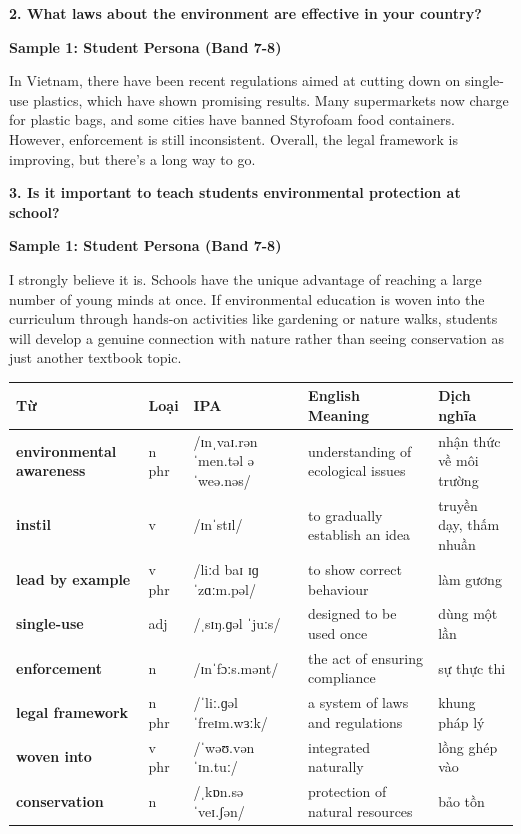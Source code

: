 \separator

\begin{ieltsquestion}
\textbf{2. What laws about the environment are effective in your country?}
\end{ieltsquestion}
\textbf{Sample 1: Student Persona (Band 7-8)}

In Vietnam, there have been recent regulations aimed at cutting down on single-use plastics, which have shown promising results. Many supermarkets now charge for plastic bags, and some cities have banned Styrofoam food containers. However, enforcement is still inconsistent. Overall, the legal framework is improving, but there's a long way to go.

\separator

\begin{ieltsquestion}
\textbf{3. Is it important to teach students environmental protection at school?}
\end{ieltsquestion}
\textbf{Sample 1: Student Persona (Band 7-8)}

I strongly believe it is. Schools have the unique advantage of reaching a large number of young minds at once. If environmental education is woven into the curriculum through hands-on activities like gardening or nature walks, students will develop a genuine connection with nature rather than seeing conservation as just another textbook topic.

\separator


\vspace{0.8em}
\begin{center}
\renewcommand{\arraystretch}{1.65}
\begin{tabularx}{\textwidth}{|V{0.22\textwidth}|C{0.07\textwidth}|I{0.20\textwidth}|Y|V{0.18\textwidth}|}
\hline
{}
\textbf{Từ} & \textbf{Loại} & \textbf{IPA} & \textbf{English Meaning} & \textbf{Dịch nghĩa} \\
\hline
\textbf{environmental awareness} & n phr & /ɪnˌvaɪ.rənˈmen.təl əˈweə.nəs/ & understanding of ecological issues & nhận thức về môi trường \\ \hline
\textbf{instil} & v & /ɪnˈstɪl/ & to gradually establish an idea & truyền dạy, thấm nhuần \\ \hline
\textbf{lead by example} & v phr & /liːd baɪ ɪɡˈzɑːm.pəl/ & to show correct behaviour & làm gương \\ \hline
\textbf{single-use} & adj & /ˌsɪŋ.ɡəl ˈjuːs/ & designed to be used once & dùng một lần \\ \hline
\textbf{enforcement} & n & /ɪnˈfɔːs.mənt/ & the act of ensuring compliance & sự thực thi \\ \hline
\textbf{legal framework} & n phr & /ˈliː.ɡəl ˈfreɪm.wɜːk/ & a system of laws and regulations & khung pháp lý \\ \hline
\textbf{woven into} & v phr & /ˈwəʊ.vən ˈɪn.tuː/ & integrated naturally & lồng ghép vào \\ \hline
\textbf{conservation} & n & /ˌkɒn.səˈveɪ.ʃən/ & protection of natural resources & bảo tồn \\ \hline
\end{tabularx}
\end{center}

